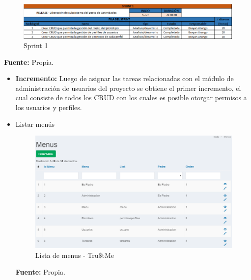 {{	\begin{figure}[H]
			\centering
			\includegraphics[width=1\linewidth]{development/sprint1.png}
			\caption{Sprint 1}
	\end{figure}
	\begin{center}
		\textbf{Fuente:} Propia.
	\end{center}

	\begin{itemize}
		
		\item \textbf{Incremento:} Luego de asignar las tareas relacionadas con el módulo de administración de usuarios del proyecto se obtiene el primer incremento, el cual consiste de todos los CRUD con los cuales es posible otorgar permisos a los usuarios y perfiles.
			
		
		\item Listar menús
			\begin{figure}[H]
				\centering
				\includegraphics[width=1\linewidth]{development/listarmenu.png}
				\caption{Lista de menus - Tru\$tMe}
			\end{figure}
			\begin{center}
				\textbf{Fuente:} Propia.
			\end{center}
			\hfill \break
		

\end{itemize}}}
